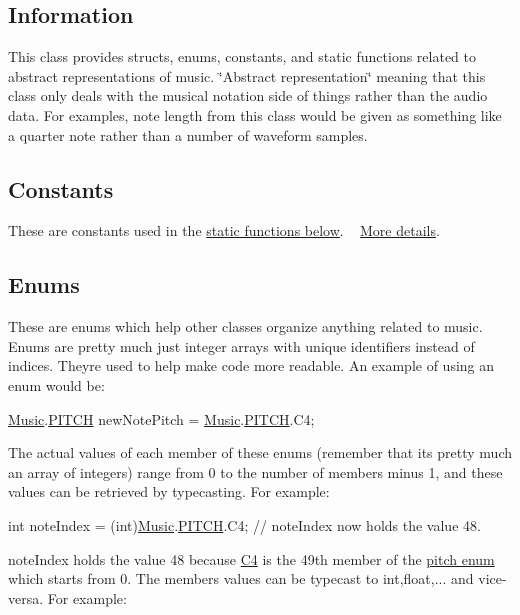\hypertarget{group___doc_music_DocMusicInfo}{}\subsection{Information}\label{group___doc_music_DocMusicInfo}
This class provides structs, enums, constants, and static functions related to abstract representations of music. \char`\"{}\+Abstract representation\char`\"{} meaning that this class only deals with the musical notation side of things rather than the audio data. For examples, note length from this class would be given as something like a quarter note rather than a number of waveform samples.\hypertarget{group___doc_music_DocMusicConstants}{}\subsection{Constants}\label{group___doc_music_DocMusicConstants}
These are constants used in the \hyperlink{group___music_stat_func}{static functions below}. ~\newline
 \hyperlink{group___music_constants}{More details}.\hypertarget{group___doc_music_DocMusicEnums}{}\subsection{Enums}\label{group___doc_music_DocMusicEnums}
These are enums which help other classes organize anything related to music. Enums are pretty much just integer arrays with unique identifiers instead of indices. They\textquotesingle{}re used to help make code more readable. An example of using an enum would be\+:
\begin{DoxyCode}
\hyperlink{class_music}{Music}.\hyperlink{group___music_enums_ga508f69b199ea518f935486c990edac1d}{PITCH} newNotePitch = \hyperlink{class_music}{Music}.\hyperlink{group___music_enums_ga508f69b199ea518f935486c990edac1d}{PITCH}.C4; 
\end{DoxyCode}
 The actual values of each member of these enums (remember that it\textquotesingle{}s pretty much an array of integers) range from 0 to the number of members minus 1, and these values can be retrieved by typecasting. For example\+: 
\begin{DoxyCode}
\textcolor{keywordtype}{int} noteIndex = (int)\hyperlink{class_music}{Music}.\hyperlink{group___music_enums_ga508f69b199ea518f935486c990edac1d}{PITCH}.C4; \textcolor{comment}{// noteIndex now holds the value 48. }
\end{DoxyCode}
 note\+Index holds the value 48 because \hyperlink{group___music_enums_gga508f69b199ea518f935486c990edac1dab713e6323a68d3ddabf4855826c50148}{C4} is the 49th member of the \hyperlink{group___music_enums_ga508f69b199ea518f935486c990edac1d}{pitch enum} which starts from 0. The members values can be typecast to int,float,... and vice-\/versa. For example\+: 

